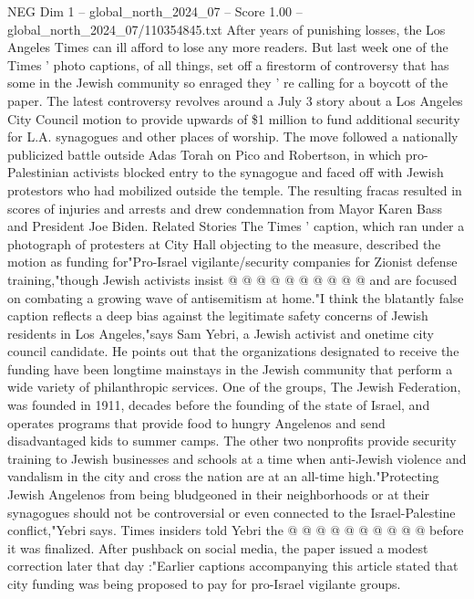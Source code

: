\begin{textsample}{NEG Dim 1 – global\_north\_2024\_07 – Score 1.00 – global\_north\_2024\_07/110354845.txt}  \label{ex:f1_neg_268}
After years of punishing losses, the Los Angeles Times can ill afford to lose any more readers.
But last week one of the Times ' photo captions, of all things, set off a firestorm of controversy that has some in the Jewish community so enraged they ' re calling for a boycott of the paper.
The latest controversy revolves around a July 3 story about a Los Angeles City Council motion to provide upwards of \$1 million to fund additional security for L.A. synagogues and other places of worship.
The move followed a nationally publicized battle outside Adas Torah on Pico and Robertson, in which pro-Palestinian activists blocked entry to the synagogue and faced off with Jewish protestors who had mobilized outside the temple.
The resulting fracas resulted in scores of injuries and arrests and drew condemnation from Mayor Karen Bass and President Joe Biden.
Related Stories The Times ' caption, which ran under a photograph of protesters at City Hall objecting to the measure, described the motion as funding for"Pro-Israel vigilante/security companies for Zionist defense training,"though Jewish activists insist @ @ @ @ @ @ @ @ @ @ and are focused on combating a growing wave of antisemitism at home."I think the blatantly false caption reflects a deep bias against the legitimate safety concerns of Jewish residents in Los Angeles,"says Sam Yebri, a Jewish activist and onetime city council candidate.
He points out that the organizations designated to receive the funding have been longtime mainstays in the Jewish community that perform a wide variety of philanthropic services.
One of the groups, The Jewish Federation, was founded in 1911, decades before the founding of the state of Israel, and operates programs that provide food to hungry Angelenos and send disadvantaged kids to summer camps.
The other two nonprofits provide security training to Jewish businesses and schools at a time when anti-Jewish violence and vandalism in the city and cross the nation are at an all-time high."Protecting Jewish Angelenos from being bludgeoned in their neighborhoods or at their synagogues should not be controversial or even connected to the Israel-Palestine conflict,"Yebri says.
Times insiders told Yebri the @ @ @ @ @ @ @ @ @ @ before it was finalized.
After pushback on social media, the paper issued a modest correction later that day :"Earlier captions accompanying this article stated that city funding was being proposed to pay for pro-Israel vigilante groups.

\end{textsample}

